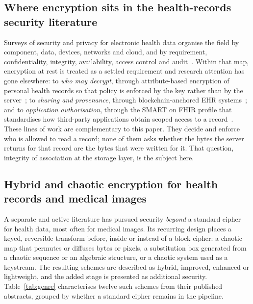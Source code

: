 \subsection{Where encryption sits in the health-records security literature}
\label{sec:ehr-lit}

Surveys of security and privacy for electronic health data organise the field by component, data, devices, networks and cloud, and by requirement, confidentiality, integrity, availability, access control and audit~\cite{oh2021ehealthsurvey,keshta2021ehr}. Within that map, encryption at rest is treated as a settled requirement and research attention has gone elsewhere: to \emph{who may decrypt}, through attribute-based encryption of personal health records so that policy is enforced by the key rather than by the server~\cite{li2013abe}; to \emph{sharing and provenance}, through blockchain-anchored EHR systems~\cite{nguyen2019blockchainehr,shi2020blockchainehr}; and to \emph{application authorisation}, through the SMART on FHIR profile that standardises how third-party applications obtain scoped access to a record~\cite{mandel2016smartfhir}. These lines of work are complementary to this paper. They decide and enforce who is allowed to read a record; none of them asks whether the bytes the server returns for that record are the bytes that were written for it. That question, integrity of association at the storage layer, is the subject here.

\subsection{Hybrid and chaotic encryption for health records and medical images}
\label{sec:genre}

A separate and active literature has pursued security \emph{beyond} a standard cipher for health data, most often for medical images. Its recurring design places a keyed, reversible transform before, inside or instead of a block cipher: a chaotic map that permutes or diffuses bytes or pixels, a substitution box generated from a chaotic sequence or an algebraic structure, or a chaotic system used as a keystream. The resulting schemes are described as hybrid, improved, enhanced or lightweight, and the added stage is presented as additional security. Table~\ref{tab:genre} characterises twelve such schemes from their published abstracts, grouped by whether a standard cipher remains in the pipeline.

